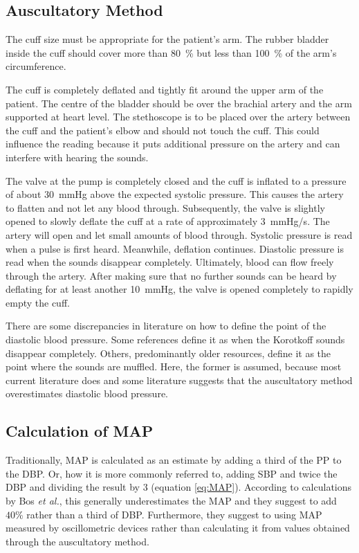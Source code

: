 \subsection{Auscultatory Method}
The cuff size must be appropriate for the patient's arm. The rubber bladder inside the cuff should cover more than \SI{80}{\%} but less than \SI{100}{\%} of the arm's circumference.

The cuff is completely deflated and tightly fit around the upper arm of the patient. The centre of the bladder should be over the brachial artery and the arm supported at heart level. The stethoscope is to be placed over the artery between the cuff and the patient's elbow and should not touch the cuff. This could influence the reading because it puts additional pressure on the artery and can interfere with hearing the sounds.\cite{Lloyd2018,Reeves1995}

The valve at the pump is completely closed and the cuff is inflated to a pressure of about \SI{30}{\mmHg} above the expected systolic pressure. This causes the artery to flatten and not let any blood through. Subsequently, the valve is slightly opened to slowly deflate the cuff at a rate of approximately \SI{3}{\mmHg/\second}. The artery will open and let small amounts of blood through. Systolic pressure is read when a pulse is first heard. Meanwhile, deflation continues. Diastolic pressure is read when the sounds disappear completely. Ultimately, blood can flow freely through the artery. After making sure that no further sounds can be heard by deflating for at least another \SI{10}{\mmHg}, the valve is opened completely to rapidly empty the cuff.\cite{Lloyd2018,Reeves1995}

There are some discrepancies in literature on how to define the point of the diastolic blood pressure. Some references define it as when the Korotkoff sounds disappear completely. \cite{Lloyd2018,Reeves1995} Others, predominantly older resources, define it as the point where the sounds are muffled.\cite{Boron2012} Here, the former is assumed, because most current literature does and some literature suggests that the auscultatory method overestimates diastolic blood pressure. \cite{Chandrasekhar2019}

\subsection{Calculation of MAP}
Traditionally, MAP is calculated as an estimate by adding a third of the PP to the DBP. Or, how it is more commonly referred to, adding SBP and twice the DBP and dividing the result by 3 (equation \ref{eq:MAP}). According to calculations by Bos \textit{et al.}, this generally underestimates the MAP and they suggest to add $40\%$ rather than a third of DBP. Furthermore, they suggest to using MAP measured by oscillometric devices rather than calculating it from values obtained through the auscultatory method. \cite{Bos2007}

